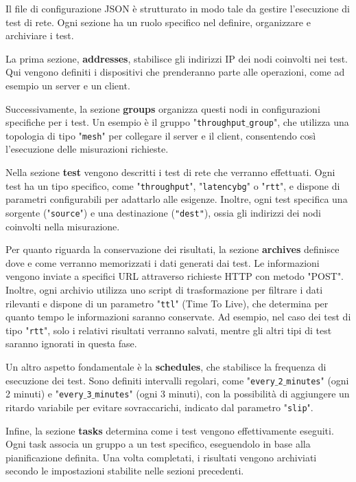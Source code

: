 \documentclass[12pt,a4paper]{report}
\begin{document}
Il file di configurazione JSON è strutturato in modo tale da gestire l'esecuzione di test di rete. Ogni sezione ha un ruolo specifico nel definire, organizzare e archiviare i test.

La prima sezione, \textbf{addresses}, stabilisce gli indirizzi IP dei nodi coinvolti nei test. Qui vengono definiti i dispositivi che prenderanno parte alle operazioni, come ad esempio un server e un client.

Successivamente, la sezione \textbf{groups} organizza questi nodi in configurazioni specifiche per i test. Un esempio è il gruppo "\texttt{throughput$\_$group}", che utilizza una topologia di tipo "\texttt{mesh}" per collegare il server e il client, consentendo così l'esecuzione delle misurazioni richieste.

Nella sezione \textbf{{test}} vengono descritti i test di rete che verranno effettuati. Ogni test ha un tipo specifico, come "\texttt{throughput}", "\texttt{latencybg}" o "\texttt{rtt}", e dispone di parametri configurabili per adattarlo alle esigenze. Inoltre, ogni test specifica una sorgente ("\texttt{source}") e una destinazione (\texttt{"dest"}), ossia gli indirizzi dei nodi coinvolti nella misurazione.

Per quanto riguarda la conservazione dei risultati, la sezione \textbf{archives} definisce dove e come verranno memorizzati i dati generati dai test. Le informazioni vengono inviate a specifici URL attraverso richieste HTTP con metodo "POST". Inoltre, ogni archivio utilizza uno script di trasformazione per filtrare i dati rilevanti e dispone di un parametro "\texttt{ttl}" (Time To Live), che determina per quanto tempo le informazioni saranno conservate. Ad esempio, nel caso dei test di tipo "\texttt{rtt}", solo i relativi risultati verranno salvati, mentre gli altri tipi di test saranno ignorati in questa fase.

Un altro aspetto fondamentale è la \textbf{schedules}, che stabilisce la frequenza di esecuzione dei test. Sono definiti intervalli regolari, come "\texttt{every$\_$2$\_$minutes}" (ogni 2 minuti) e "\texttt{every$\_$3$\_$minutes}" (ogni 3 minuti), con la possibilità di aggiungere un ritardo variabile per evitare sovraccarichi, indicato dal parametro "\texttt{slip}".

Infine, la sezione \textbf{tasks} determina come i test vengono effettivamente eseguiti. Ogni task associa un gruppo a un test specifico, eseguendolo in base alla pianificazione definita. Una volta completati, i risultati vengono archiviati secondo le impostazioni stabilite nelle sezioni precedenti.
\end{document}
